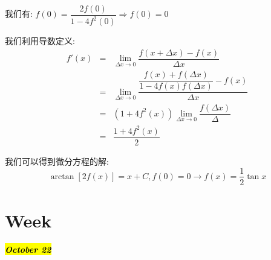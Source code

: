 \begin{solution}

	我们有:  $f(0)=\dfrac{2f(0)}{1-4f^2(0)}\Rightarrow f(0)=0$
	
	我们利用导数定义:  
	\begin{eqnarray*}
		f'(x)&=&\lim\limits_{\Delta x\rightarrow 0}\dfrac{f(x+\Delta x)-f(x)}{\Delta x}\\
		&=&\lim\limits_{\Delta x\rightarrow 0}\dfrac{\dfrac{f(x)+f(\Delta x)}{1-4f(x)f(\Delta x)}-f(x)}{\Delta x}\\
		&=&(1+4f^{2}(x))\lim\limits_{\Delta x\rightarrow 0}\dfrac{f(\Delta x)}{\Delta}\\
		&=&\dfrac{1+4f^{2}(x)}{2}
	\end{eqnarray*}
	
	我们可以得到微分方程的解:  
	$$\arctan[2f(x)]=x+C,f(0)=0\rightarrow f(x)=\dfrac{1}{2}\tan x$$
\end{solution}

\section{Week }
\hl{\textbf{\textit{October 22}}}

